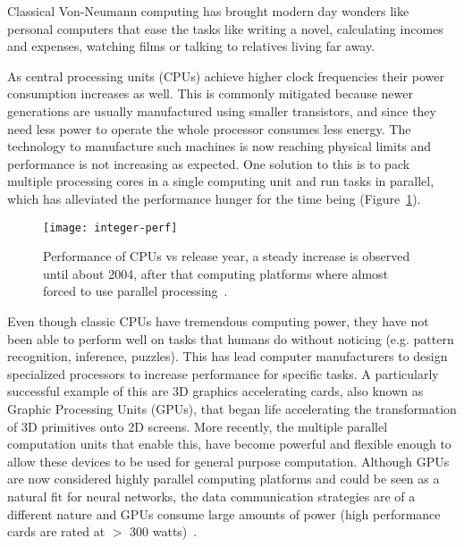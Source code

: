 Classical Von-Neumann computing has brought modern day wonders like personal computers that ease the tasks like writing a novel, calculating incomes and expenses, watching films or talking to relatives living far away. 

As central processing units (CPUs) achieve higher clock frequencies their power consumption increases as well. This is commonly mitigated because newer generations are usually manufactured using smaller transistors, and since they need less power to operate the whole processor consumes less energy. The technology to manufacture such machines is now reaching physical limits and performance is not increasing as expected. One solution to this is to pack multiple processing cores in a single computing unit and run tasks in parallel, which has alleviated the performance hunger for the time being (Figure~\ref{fig:comp:moore}). 

\begin{figure}[h]
  \begin{center}
    \texttt{[image: integer-perf]}
    \caption{Performance of CPUs vs release year, a steady increase is observed until about 2004, after that computing platforms where almost forced to use parallel processing~\cite{int-perf-images}. }
    \label{fig:comp:moore}
  \end{center}
\end{figure}

Even though classic CPUs have tremendous computing power, they have not been able to perform well on tasks that humans do without noticing (e.g. pattern recognition, inference, puzzles). This has lead computer manufacturers to design specialized processors to increase performance for specific tasks. A particularly successful example of this are 3D graphics accelerating cards, also known as Graphic Processing Units (GPUs), that began life accelerating the transformation of 3D primitives onto 2D screens. More recently, the multiple parallel computation units that enable this, have become powerful and flexible enough to allow these devices to be used for general purpose computation.
Although GPUs are now considered highly parallel computing platforms and could be seen as a natural fit for neural networks, the data communication strategies are of a different nature and GPUs consume large amounts of power (high performance cards are rated at $>$ 300 watts)~\cite{nvidia, amd}.


